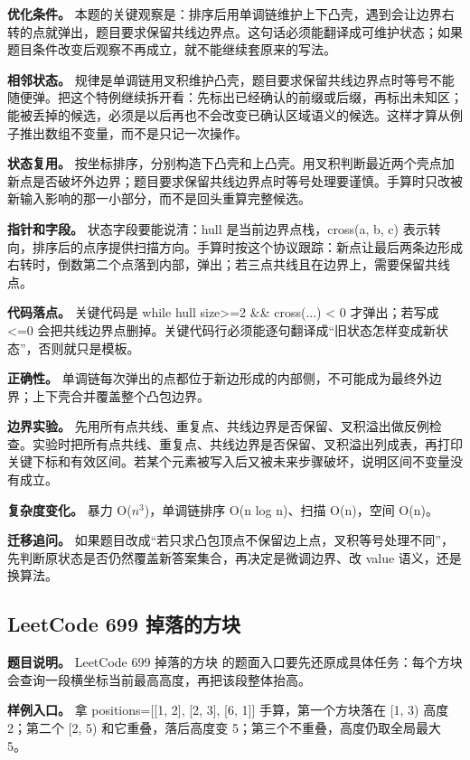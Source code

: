 \textbf{优化条件。} 本题的关键观察是：排序后用单调链维护上下凸壳，遇到会让边界右转的点就弹出，题目要求保留共线边界点。这句话必须能翻译成可维护状态；如果题目条件改变后观察不再成立，就不能继续套原来的写法。

\textbf{相邻状态。} 规律是单调链用叉积维护凸壳，题目要求保留共线边界点时等号不能随便弹。把这个特例继续拆开看：先标出已经确认的前缀或后缀，再标出未知区；能被丢掉的候选，必须是以后再也不会改变已确认区域语义的候选。这样才算从例子推出数组不变量，而不是只记一次操作。

\textbf{状态复用。} 按坐标排序，分别构造下凸壳和上凸壳。用叉积判断最近两个壳点加新点是否破坏外边界；题目要求保留共线边界点时等号处理要谨慎。手算时只改被新输入影响的那一小部分，而不是回头重算完整候选。

\textbf{指针和字段。} 状态字段要能说清：hull 是当前边界点栈，cross(a, b, c) 表示转向，排序后的点序提供扫描方向。手算时按这个协议跟踪：新点让最后两条边形成右转时，倒数第二个点落到内部，弹出；若三点共线且在边界上，需要保留共线点。

\textbf{代码落点。} 关键代码是 while hull size>=2 \&\& cross(...) < 0 才弹出；若写成 <=0 会把共线边界点删掉。关键代码行必须能逐句翻译成“旧状态怎样变成新状态”，否则就只是模板。

\textbf{正确性。} 单调链每次弹出的点都位于新边形成的内部侧，不可能成为最终外边界；上下壳合并覆盖整个凸包边界。

\textbf{边界实验。} 先用所有点共线、重复点、共线边界是否保留、叉积溢出做反例检查。实验时把所有点共线、重复点、共线边界是否保留、叉积溢出列成表，再打印关键下标和有效区间。若某个元素被写入后又被未来步骤破坏，说明区间不变量没有成立。

\textbf{复杂度变化。} 暴力 O(\ensuremath{n^{3}})，单调链排序 O(n log n)、扫描 O(n)，空间 O(n)。

\textbf{迁移追问。} 如果题目改成“若只求凸包顶点不保留边上点，叉积等号处理不同”，先判断原状态是否仍然覆盖新答案集合，再决定是微调边界、改 value 语义，还是换算法。

\subsection{LeetCode 699 掉落的方块}

\textbf{题目说明。} LeetCode 699 掉落的方块 的题面入口要先还原成具体任务：每个方块会查询一段横坐标当前最高高度，再把该段整体抬高。

\textbf{样例入口。} 拿 positions=[[1, 2], [2, 3], [6, 1]] 手算，第一个方块落在 [1, 3) 高度 2；第二个 [2, 5) 和它重叠，落后高度变 5；第三个不重叠，高度仍取全局最大 5。

